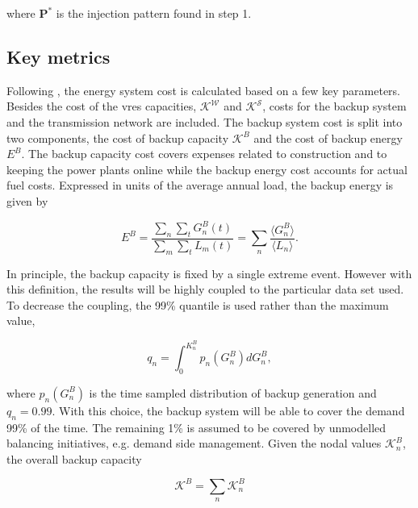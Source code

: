 \documentclass[a4paper, 5p, sort&compress]{elsarticle}%
\begin{document}
where $\mathbf{P}^{*}$ is the injection pattern found in step 1.


\subsection{Key metrics}
\label{sec:key}


Following \cite{Sensitivity}, the energy system cost is calculated
based on a few key parameters. Besides the cost of the \gls{vres}
capacities, $\mathcal{K^{W}}$ and $\mathcal{K^S}$, costs for the
backup system and the transmission network are included. The backup
system cost is split into two components, the cost of backup capacity
$\mathcal{K}^{B}$ and the cost of backup energy $E^{B}$. The backup
capacity cost covers expenses related to construction and to keeping
the power plants online while the backup energy cost accounts for
actual fuel costs. Expressed in units of the average annual load, the
backup energy is given by

\begin{equation}
  \label{eq:backup-energy}
  E^{B} =\frac{\sum_{n} \sum_{t} G^{B}_{n}(t)}{\sum_{m} \sum_{t}
    L_{m}(t)} = \sum_{n} \frac{\langle G^{B}_{n} \rangle}{\langle L_{n}
    \rangle} .
\end{equation}

In principle, the backup capacity is fixed by a single extreme
event. However with this definition, the results will be highly
coupled to the particular data set used. To decrease the coupling, the
99\% quantile is used rather than the maximum value,

\begin{equation}
  \label{eq:2}
  q_{n} = \int _{0} ^{K_{n}^{B}} p_{n}(G^{B}_{n})dG^{B}_{n},
\end{equation}

where $p_{n}(G^{B}_{n})$ is the time sampled distribution of backup
generation and $q_{n} = 0.99$. With this choice, the backup system
will be able to cover the demand 99\% of the time. The remaining 1\%
is assumed to be covered by unmodelled balancing initiatives,
e.g. demand side management. Given the nodal values
$\mathcal{K}^{B}_{n}$, the overall backup capacity

\begin{equation}
  \label{eq:4}
  \mathcal{K}^{B} = \sum_{n} \mathcal{K}^{B}_{n}
\end{equation}
\end{document}
